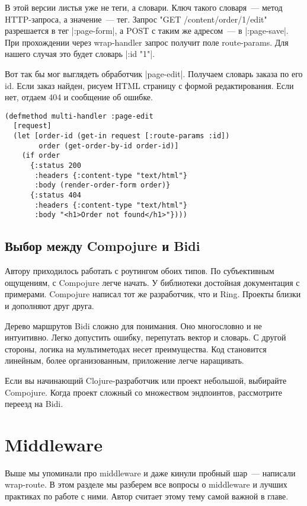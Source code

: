 В этой версии листья уже не теги, а словари. Ключ такого словаря~--- метод
HTTP-запроса, а значение~--- тег. Запрос "GET /content/order/1/edit" разрешается в
тег \spverb|:page-form|, а POST с таким же адресом~--- в \spverb|:page-save|. При прохождении
через wrap-handler запрос получит поле route-params. Для нашего случая это будет
словарь \spverb|{:id "1"}|.

Вот так бы мог выглядеть обработчик \spverb|page-edit|. Получаем словарь заказа по его
id. Если заказ найден, рисуем HTML страницу с формой редактирования. Если нет,
отдаем 404 и сообщение об ошибке.

\begin{verbatim}
(defmethod multi-handler :page-edit
  [request]
  (let [order-id (get-in request [:route-params :id])
        order (get-order-by-id order-id)]
    (if order
      {:status 200
       :headers {:content-type "text/html"}
       :body (render-order-form order)}
      {:status 404
       :headers {:content-type "text/html"}
       :body "<h1>Order not found</h1>"})))
\end{verbatim}

\subsection{Выбор между Compojure и Bidi}

Автору приходилось работать с роутингом обоих типов. По субъективным ощущениям,
с Compojure легче начать. У библиотеки достойная документация с
примерами. Compojure написал тот же разработчик, что и Ring. Проекты близки и
дополняют друг друга.

Дерево маршрутов Bidi сложно для понимания. Оно многословно и не
интуитивно. Легко допустить ошибку, перепутать вектор и словарь. С другой
стороны, логика на мультиметодах несет преимущества. Код становится линейным,
более организованным, приложение легче наращивать.

Если вы начинающий Clojure-разработчик или проект небольшой, выбирайте
Compojure. Когда проект сложный со множеством эндпоинтов, рассмотрите переезд на
Bidi.

\section{Middleware}

Выше мы упоминали про middleware и даже кинули пробный шар~--- написали
wrap-route. В этом разделе мы разберем все вопросы о middleware и лучших
практиках по работе с ними. Автор считает этому тему самой важной в главе.

